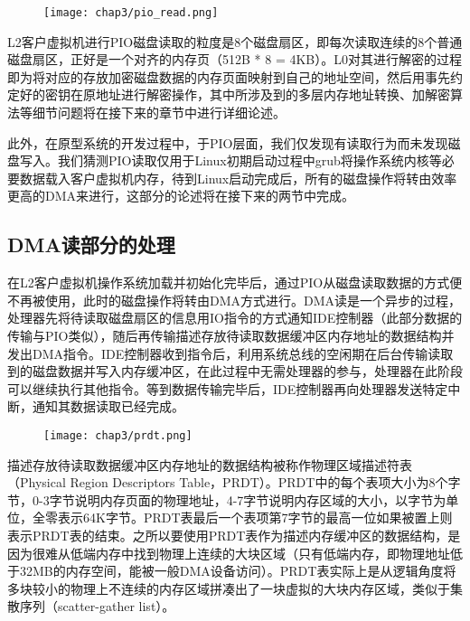 \begin{figure}[!htbp]
  \centering
  \texttt{[image: chap3/pio\_read.png]}
\end{figure}

L2客户虚拟机进行PIO磁盘读取的粒度是8个磁盘扇区，即每次读取连续的8个普通磁盘扇区，正好是一个对齐的内存页（512B * 8 = 4KB）。L0对其进行解密的过程即为将对应的存放加密磁盘数据的内存页面映射到自己的地址空间，然后用事先约定好的密钥在原地址进行解密操作，其中所涉及到的多层内存地址转换、加解密算法等细节问题将在接下来的章节中进行详细论述。

此外，在原型系统的开发过程中，于PIO层面，我们仅发现有读取行为而未发现磁盘写入。我们猜测PIO读取仅用于Linux初期启动过程中grub将操作系统内核等必要数据载入客户虚拟机内存，待到Linux启动完成后，所有的磁盘操作将转由效率更高的DMA来进行，这部分的论述将在接下来的两节中完成。

\subsection{DMA读部分的处理}

在L2客户虚拟机操作系统加载并初始化完毕后，通过PIO从磁盘读取数据的方式便不再被使用，此时的磁盘操作将转由DMA方式进行。DMA读是一个异步的过程，处理器先将待读取磁盘扇区的信息用IO指令的方式通知IDE控制器（此部分数据的传输与PIO类似），随后再传输描述存放待读取数据缓冲区内存地址的数据结构并发出DMA指令。IDE控制器收到指令后，利用系统总线的空闲期在后台传输读取到的磁盘数据并写入内存缓冲区，在此过程中无需处理器的参与，处理器在此阶段可以继续执行其他指令。等到数据传输完毕后，IDE控制器再向处理器发送特定中断，通知其数据读取已经完成。

\begin{figure}[!htbp]
  \centering
  \texttt{[image: chap3/prdt.png]}
\end{figure}

描述存放待读取数据缓冲区内存地址的数据结构被称作物理区域描述符表（Physical Region Descriptors Table，PRDT）。PRDT中的每个表项大小为8个字节，0-3字节说明内存页面的物理地址，4-7字节说明内存区域的大小，以字节为单位，全零表示64K字节。PRDT表最后一个表项第7字节的最高一位如果被置上则表示PRDT表的结束。之所以要使用PRDT表作为描述内存缓冲区的数据结构，是因为很难从低端内存中找到物理上连续的大块区域（只有低端内存，即物理地址低于32MB的内存空间，能被一般DMA设备访问）。PRDT表实际上是从逻辑角度将多块较小的物理上不连续的内存区域拼凑出了一块虚拟的大块内存区域，类似于集散序列（scatter-gather list）。


